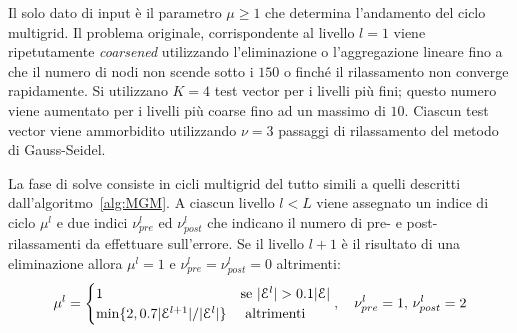
\label{faseSetup}

Il solo dato di input è il parametro $\mu \geq 1$ che determina l'andamento del ciclo multigrid.
Il problema originale, corrispondente al livello $l = 1$ viene ripetutamente \emph{coarsened} utilizzando l'eliminazione o l'aggregazione lineare fino a che il numero di nodi non scende sotto i $150$ o finché il rilassamento non converge rapidamente.
Si utilizzano $K=4$ test vector per i livelli più fini; questo numero viene aumentato per i livelli più coarse fino ad un massimo di $10$. Ciascun test vector viene ammorbidito utilizzando $\nu = 3$ passaggi di rilassamento del metodo di Gauss-Seidel.

La fase di solve consiste in cicli multigrid del tutto simili a quelli descritti dall'algoritmo~\vref{alg:MGM}.
A ciascun livello $l < L$ viene assegnato un indice di ciclo $\mu^l$ e due indici $\nu_{pre}^l$ ed $\nu_{post}^l$ che indicano il numero di pre- e post- rilassamenti da effettuare sull'errore.
Se il livello $l+1$ è il risultato di una eliminazione allora $\mu^l = 1$ e $\nu_{pre}^l = \nu_{post}^l = 0$ altrimenti:
\begin{equation}
\mu^l = 
\begin{cases}
1 & \text{se } |\mathcal{E}^l| > 0.1|\mathcal{E}|\\
\min\{2,0.7 |\mathcal{E}^{l+1}| / |\mathcal{E}^l|\} & \text{ altrimenti}
\end{cases},\quad
\nu_{pre}^l = 1,\, \nu_{post}^l=2
\end{equation}